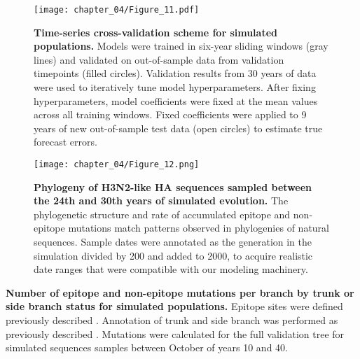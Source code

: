 \begin{figure}
  \begin{center}
  \texttt{[image: chapter\_04/Figure\_11.pdf]}
  \caption[{Time-series cross-validation scheme for simulated populations.}]{
  {\bf Time-series cross-validation scheme for simulated populations.}
  Models were trained in six-year sliding windows (gray lines) and validated on out-of-sample data from validation timepoints (filled circles).
  Validation results from 30 years of data were used to iteratively tune model hyperparameters.
  After fixing hyperparameters, model coefficients were fixed at the mean values across all training windows.
  Fixed coefficients were applied to 9 years of new out-of-sample test data (open circles) to estimate true forecast errors.
  }
  \label{fig:cross_validation_for_simulated_populations}
  \end{center}
\end{figure}

\begin{figure}
  \begin{center}
  \texttt{[image: chapter\_04/Figure\_12.png]}
  \caption[{Phylogeny of H3N2-like HA sequences sampled between the 24th and 30th years of simulated evolution.}]{
  {\bf Phylogeny of H3N2-like HA sequences sampled between the 24th and 30th years of simulated evolution.}
  The phylogenetic structure and rate of accumulated epitope and non-epitope mutations match patterns observed in phylogenies of natural sequences.
  Sample dates were annotated as the generation in the simulation divided by 200 and added to 2000, to acquire realistic date ranges that were compatible with our modeling machinery.
  }
  \label{fig:simulated_h3n2_ha_phylogeny}
  \end{center}
\end{figure}

\begin{table}
  \begin{center}
    
    \caption[{Number of epitope and non-epitope mutations per branch by trunk or side branch status for simulated populations.}]{
    {\bf Number of epitope and non-epitope mutations per branch by trunk or side branch status for simulated populations.}
    Epitope sites were defined previously described \citep{Luksza:2014hj}.
    Annotation of trunk and side branch was performed as previously described \citep{Bedford:2015fj}.
    Mutations were calculated for the full validation tree for simulated sequences samples between October of years 10 and 40.
    }
    \label{table:mutations_by_trunk_status_for_simulated_populations}
  \end{center}
\end{table}

